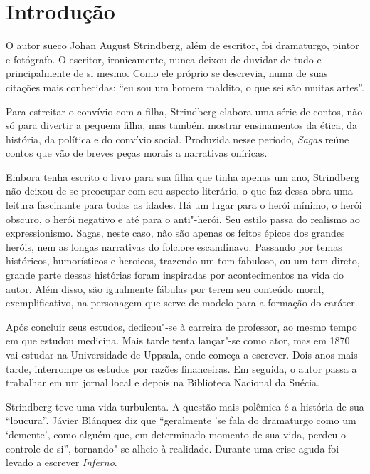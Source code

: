 \documentclass[12pt]{extarticle}
\begin{document}
\tableofcontents


\section{Introdução}

O autor sueco Johan August Strindberg, além de escritor, foi dramaturgo, pintor e fotógrafo.
O escritor, ironicamente, nunca deixou de duvidar de tudo e principalmente de si mesmo.
Como ele próprio se descrevia, numa de suas citações mais conhecidas: ``eu sou um homem maldito, o que sei são muitas artes''.

Para estreitar o convívio com a filha, Strindberg elabora uma série de contos, não só para divertir a pequena filha, mas também mostrar ensinamentos da ética, da história, da política e do convívio social. Produzida nesse período, \textit{Sagas} reúne contos que vão de breves peças morais a narrativas oníricas.

Embora tenha escrito o livro para sua filha que tinha apenas um ano, Strindberg não deixou de se preocupar com seu aspecto literário, o que faz dessa obra uma leitura fascinante para todas as idades.
Há um lugar para o herói mínimo, o herói obscuro, o herói negativo e até para o anti"-herói.
Seu estilo passa do realismo ao expressionismo. 
Sagas, neste caso, não são apenas os feitos épicos dos grandes heróis, nem as longas narrativas do folclore escandinavo.
Passando por temas históricos, humorísticos e heroicos, trazendo um tom fabuloso, ou um tom direto, grande parte dessas histórias foram inspiradas por acontecimentos na vida do autor.
Além disso, são igualmente fábulas por terem seu conteúdo moral, exemplificativo, na personagem que serve de modelo para a formação do caráter.


Após concluir seus estudos, dedicou"-se à carreira de professor, ao mesmo tempo em que estudou medicina.
Mais tarde tenta lançar"-se como ator, mas em 1870 vai estudar na Universidade de Uppsala, 
onde começa a escrever. Dois anos mais tarde, interrompe os estudos por razões financeiras.
Em seguida, o autor passa a trabalhar em um jornal local e depois na Biblioteca Nacional da Suécia.

Strindberg teve uma vida turbulenta. A questão mais polêmica é a história de sua ``loucura''. Jávier 
Blánquez diz que ``geralmente 'se fala do dramaturgo como um ‘demente’, como alguém que, em determinado momento de sua vida, perdeu o controle de si'', tornando"-se alheio à realidade. 
Durante uma crise aguda foi levado a escrever \textit{Inferno}.
\end{document}
